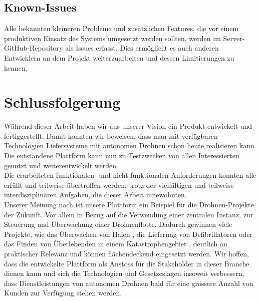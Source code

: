 \subsection{Known-Issues}

Alle bekannten kleineren Probleme und zusätzlichen Features, die vor einem produktiven Einsatz des Systems umgesetzt werden sollten, werden im Server-GitHub-Repository als Issues erfasst. Dies ermöglicht es auch anderen Entwicklern an dem Projekt weiterzuarbeiten und dessen Limitierungen zu kennen.

\newpage
\section{Schlussfolgerung}

Während dieser Arbeit haben wir aus unserer Vision ein Produkt entwickelt und fertiggestellt. Damit konnten wir beweisen, dass man mit verfügbaren Technologien Liefersysteme mit autonomen Drohnen schon heute realisieren kann. Die entstandene Plattform kann nun zu Testzwecken von allen Interessierten genutzt und weiterentwickelt werden.\\

Die erarbeiteten funktionalen- und nicht-funktionalen Anforderungen konnten alle erfüllt und teilweise übertroffen werden, trotz der vielfältigen und teilweise interdisziplinären Aufgaben, die dieser Arbeit innewohnten. \\

Unserer Meinung nach ist unsere Plattform ein Beispiel für die Drohnen-Projekte der Zukunft. Vor allem in Bezug auf die Verwendung einer zentralen Instanz, zur Steuerung und Überwachung einer Drohnenflotte. Dadurch gewinnen viele Projekte, wie das Überwachen von Haien \cite{shark}, die Lieferung von Defibrillatoren \cite{defibrillator-drone} oder das Finden von Überlebenden in einem Katastrophengebiet \cite{catastrophic-drone}, deutlich an praktischer Relevanz und können flächendeckend eingesetzt werden. Wir hoffen, dass die entwickelte Plattform als Anstoss für die Stakeholder in dieser Branche dienen kann und sich die Technologien und Gesetzeslagen insoweit verbessern, dass Dienstleistungen von autonomen Drohnen bald für eine grössere Anzahl von Kunden zur Verfügung stehen werden.





